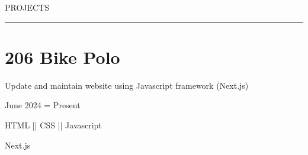 \vspace{-1.4ex}
{
\hspace{-1.72in}\noindent\color{cblue}
{PROJECTS} 
}

\vspace{-1.6ex}
{\hspace{-1.73in}\noindent\color{dblue}\rule{6.935in}{0.4pt}} %

\vspace{-0.4ex}

\section
{\textbf{206 Bike Polo}
\newline
\newline}


\vspace{-2.5ex}
\begin{detail}
\BulletItem
Update and maintain website using Javascript framework (Next.js)
\end{detail}

\begin{subtitle}
\vspace{-5ex}
{{June 2024 = Present}} 
\end{subtitle}

\vspace{-1.5ex}
{
\vspace{-0.8ex}
\color{cyan}\small
{HTML || CSS || Javascript} %
}

{
\vspace{-2.5ex}\hspace{1.5in}
\color{cyan}\small
{Next.js} %
}


\vspace{2.5ex}